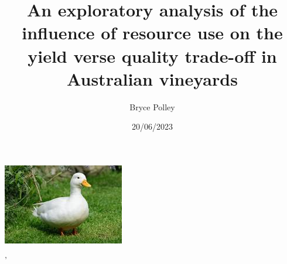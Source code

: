\documentclass[review,12pt,authoryear]{elsarticle}
\begin{document}
\begin{linenumbers}
\begin{frontmatter}
\title{An exploratory analysis of the influence of resource use on the yield verse quality trade-off in Australian vineyards}
\author[label1,label2,label3]{Bryce Polley}
\date{20/06/2023}
\begin{abstract}
\end{abstract}
\begin{graphicalabstract}
  \includegraphics{graphical_abstract.jpeg}
\end{graphicalabstract}'


\end{frontmatter}
\end{linenumbers}
\end{document}
